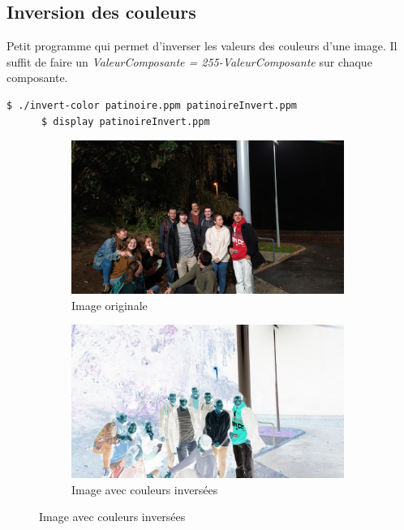 \documentclass[a4paper,10pt]{article}
\begin{document}
    \subsection{Inversion des couleurs}
    Petit programme qui permet d'inverser les valeurs des couleurs d'une image. Il suffit de faire un \emph{ValeurComposante = 255-ValeurComposante} sur chaque composante.
    \begin{lstlisting}[language=Bash]
      $ ./invert-color patinoire.ppm patinoireInvert.ppm       
      $ display patinoireInvert.ppm 
    \end{lstlisting}
    \begin{figure}[h]
      \begin{subfigure}{0.6\textwidth}
       \includegraphics[width=1\linewidth, height=5cm]{patinoire3}
       \caption{Image originale}
       \label{fig:patinoire}
       \end{subfigure}
        \begin{subfigure}{0.6\textwidth}
       \includegraphics[width=1\linewidth, height=5cm]{patinoire3Invert.jpeg}   
       \caption{Image avec couleurs inversées}
       \label{fig:patinoireInvert}
       \end{subfigure}
       \end{figure}
\end{document}
